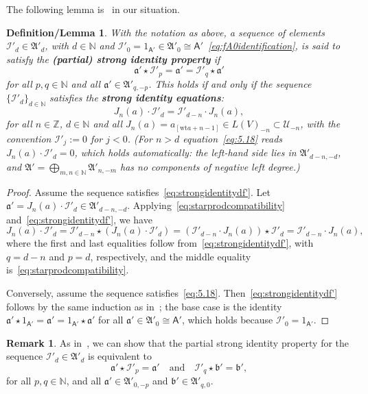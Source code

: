 \documentclass[12pt,a4paper,reqno]{amsart}
\numberwithin{equation}{section}
\newtheorem{deflemma}[theorem]{Definition/Lemma}
\theoremstyle{definition}
\newtheorem{remark}[theorem]{Remark}
\newcommand{\N}{\mathbb{N}}
\newcommand{\Z}{\mathbb{Z}}
\newcommand{\I}{\mathscr{I}}
\def\wt{\mathrm{wt}}
\def\scrU{\mathscr{U}}
\def\fA{\mathfrak{A}}
\def\A{\mathsf{A}}
\def\fa{\mathfrak{a}}
\def\fb{\mathfrak{b}}
\begin{document}
The following lemma is~\cite[Lemma 5.1.5]{DGK2} in our situation.
\begin{deflemma}\label{def:strong_identity}
    With the notation as above, a sequence of elements $\I'_d\in \fA'_d$, with $d\in \N$ and $\I'_0=1_{\A'}\in \fA'_0\cong \A'$~\eqref{eq:fA0identification}, is said to satisfy the \textbf{(partial) strong identity property} if
\begin{equation}\label{eq:strongidentitydf'}
\fa'\star\I'_p=\fa'=\I'_q\star \fa'
\end{equation}
for all $p,q\in \N$ and all $\fa'\in \fA'_{q,-p}$. This holds if and only if the sequence $\{\I'_d\}_{d\in \N}$ satisfies the \textbf{strong identity equations}:
\begin{equation}\label{eq:5.18}
J_n(a)\cdot \I'_d=\I'_{d-n}\cdot J_{n}(a),
\end{equation}
for all $n\in \Z$, $d\in \N$ and all $J_n(a)=a_{[\wt a +n-1]}\in L(V)_{-n}\subset \scrU_{-n}$, with the convention $\I'_j:=0$ for $j<0$. (For $n>d$ equation~\eqref{eq:5.18} reads $J_n(a)\cdot \I'_d=0$, which holds automatically: the left-hand side lies in $\fA'_{d-n,-d}$, and $\fA'=\bigoplus_{m,n\in\N}\fA'_{n,-m}$ has no components of negative left degree.)
\end{deflemma}
\begin{proof}
Assume the sequence satisfies~\eqref{eq:strongidentitydf'}. Let $\fa'=J_n(a)\cdot\I'_d\in \fA'_{d-n,-d}$. Applying~\eqref{eq:starprodcompatibility} and~\eqref{eq:strongidentitydf'}, we have
\[
J_n(a)\cdot \I'_d=\I'_{d-n}\star(J_n(a)\cdot \I'_d)=(\I'_{d-n}\cdot J_n(a))\star \I'_d=\I'_{d-n}\cdot J_n(a),
\]
where the first and last equalities follow from~\eqref{eq:strongidentitydf'}, with $q=d-n$ and $p=d$, respectively, and the middle equality is~\eqref{eq:starprodcompatibility}.

Conversely, assume the sequence satisfies~\eqref{eq:5.18}. Then~\eqref{eq:strongidentitydf'} follows by the same induction as in~\cite[Lemma 5.1.5]{DGK2}; the base case is the identity $\fa'\star 1_{\A'}=\fa'=1_{\A'}\star \fa'$ for all $\fa'\in \fA'_0\cong \A'$, which holds because $\I'_0=1_{\A'}$.
 \end{proof}

\begin{remark}
As in~\cite[Lemma 5.1.5]{DGK2}, we can show that the partial strong identity property for the sequence $\I'_d\in \fA'_d$ is equivalent to 
\begin{equation}\label{eq:strongidentitydf''}
\fa'\star\I'_p=\fa'\quad \text{and}\quad \I'_q\star \fb'=\fb',
\end{equation}
for all $p,q\in \N$, and all $\fa'\in \fA'_{0,-p}$ and $\fb'\in \fA'_{q,0}$.
\end{remark}
\end{document}
